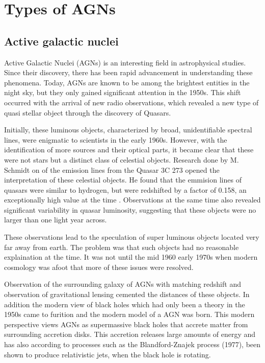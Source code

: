 \documentclass{article}
\begin{document}
\section{Types of AGNs}

\subsection{Active galactic nuclei}



Active Galactic Nuclei (AGNs) is an interesting field in astrophysical studies. 
Since their discovery, there has been rapid advancement in understanding these phenomena.
Today, AGNs are known to be among the brightest entities in the night sky,
but they only gained significant attention in the 1950s. 
This shift occurred with the arrival of new radio observations, which revealed a new type of quasi stellar
object through the discovery of Quasars.

Initially, these luminous objects, characterized by broad, 
unidentifiable spectral lines, were enigmatic to scientists in the early 1960s. 
However, with the identification of more sources and their optical parts, 
it became clear that these were not stars but a distinct class of celestial objects. 
Research done by M. Schmidt on of the emission lines from 
the Quasar 3C 273 opened the interpretation of these celestial objects. 
He found that the emmision lines of quasars were similar to hydrogen, but were redshifted by a factor of 0.158,
an exceptionally high value at the time \cite{Shields_1999}. Observations at the same time also revealed significant 
variability in quasar luminosity, suggesting that these objects were no larger than one light year across. 

These observations lead to the speculation of super luminous objects located very far away from earth. The problem was that such objects
had no reasonable explaination at the time. It was not until the mid 1960 early 1970s when modern cosmology was 
afoot that more of these issues were resolved.

Observation of the surrounding galaxy of AGNs with matching redshift and observation of gravitational lensing cemented 
the distances of these objects. In addition the modern view of black holes which had only been a theory in the 1950s came to
furition and the modern model of a AGN was born. This modern perspective views AGNs as supermassive black holes that
accrete matter from surrounding accretion disks. This accretion releases large amounts of energy and has also according to 
processes such as  the Blandford-Znajek process (1977), been shown to produce relativistic jets, when the black hole is rotating.
\end{document}
